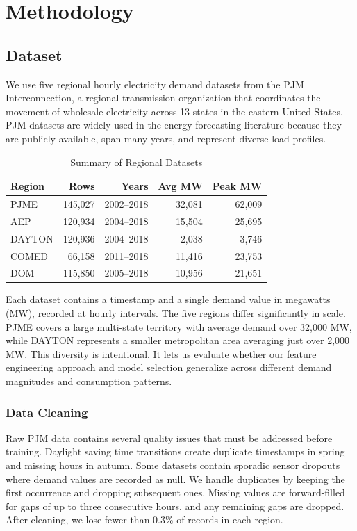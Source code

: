\documentclass[conference]{IEEEtran}
\begin{document}
\section{Methodology}

\subsection{Dataset}

We use five regional hourly electricity demand datasets from the PJM Interconnection, a regional transmission organization that coordinates the movement of wholesale electricity across 13 states in the eastern United States. PJM datasets are widely used in the energy forecasting literature because they are publicly available, span many years, and represent diverse load profiles.

\begin{table}[h]
\centering
\small
\caption{Summary of Regional Datasets}
\begin{tabular}{|l|r|r|r|r|}
\hline
\textbf{Region} & \textbf{Rows} & \textbf{Years} & \textbf{Avg MW} & \textbf{Peak MW} \\
\hline
PJME   & 145,027 & 2002--2018 & 32,081 & 62,009 \\
AEP    & 120,934 & 2004--2018 & 15,504 & 25,695 \\
DAYTON & 120,936 & 2004--2018 &  2,038 &  3,746 \\
COMED  &  66,158 & 2011--2018 & 11,416 & 23,753 \\
DOM    & 115,850 & 2005--2018 & 10,956 & 21,651 \\
\hline
\end{tabular}
\label{tab:datasets}
\end{table}

Each dataset contains a timestamp and a single demand value in megawatts (MW), recorded at hourly intervals. The five regions differ significantly in scale. PJME covers a large multi-state territory with average demand over 32,000 MW, while DAYTON represents a smaller metropolitan area averaging just over 2,000 MW. This diversity is intentional. It lets us evaluate whether our feature engineering approach and model selection generalize across different demand magnitudes and consumption patterns.

\subsubsection{Data Cleaning}

Raw PJM data contains several quality issues that must be addressed before training. Daylight saving time transitions create duplicate timestamps in spring and missing hours in autumn. Some datasets contain sporadic sensor dropouts where demand values are recorded as null. We handle duplicates by keeping the first occurrence and dropping subsequent ones. Missing values are forward-filled for gaps of up to three consecutive hours, and any remaining gaps are dropped. After cleaning, we lose fewer than 0.3\% of records in each region.
\end{document}
